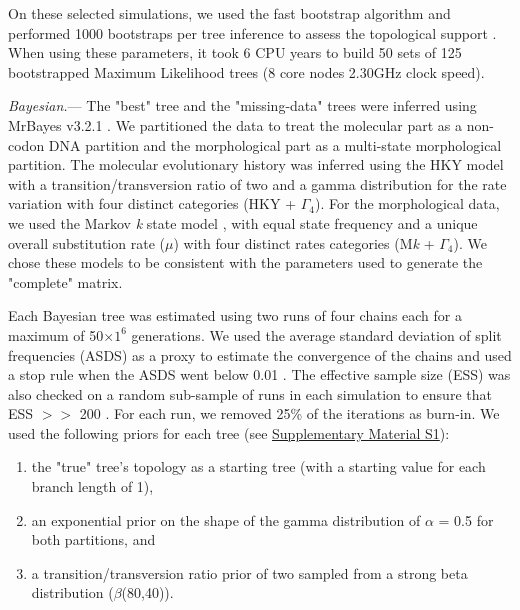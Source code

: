 \documentclass[12pt,letterpaper]{article}
\renewcommand{\subsubsection}[1]{%
\vspace{2ex}
\noindent
\textit{#1.}---}
\begin{document}
On these selected simulations, we used the fast bootstrap algorithm and performed 1000 bootstraps per tree inference to assess the topological support \citep{pattengale2010many}.
When using these parameters, it took 6 CPU years to build 50 sets of 125 bootstrapped Maximum Likelihood trees (8 core nodes 2.30GHz clock speed).

\subsubsection{Bayesian}
The "best" tree and the "missing-data" trees were inferred using MrBayes v3.2.1 \citep{Ronquist2012mrbayes}. We partitioned the data to treat the molecular part as a non-codon DNA partition and the morphological part as a multi-state morphological partition. The molecular evolutionary history was inferred using the HKY model with a transition/transversion ratio of two \citep{douadycomparison2003} and a gamma distribution for the rate variation with four distinct categories (HKY + $\Gamma_4$). For the morphological data, we used the Markov \textit{k} state model \citep{lewisa2001}, with equal state frequency and a unique overall substitution rate ($\mu$) with four distinct rates categories (M\textit{k} + $\Gamma_4$). We chose these models to be consistent with the parameters used to generate the "complete" matrix.

Each Bayesian tree was estimated using two runs of four chains each for a maximum of 50$\times$$1^6$ generations. We used the average standard deviation of split frequencies (ASDS) as a proxy to estimate the convergence of the chains and used a stop rule when the ASDS went below 0.01 \citep{Ronquist2012mrbayes}. The effective sample size (ESS) was also checked on a random sub-sample of runs in each simulation to ensure that ESS $>>$ 200 \citep{drummond2006ess}. For each run, we removed 25\% of the iterations as burn-in. We used the following priors for each tree (see \hyperref[SupplementaryMaterial]{Supplementary Material S1}):
\begin{enumerate}
\item the "true" tree’s topology as a starting tree (with a starting value for each branch length of 1),
\item an exponential prior on the shape of the gamma distribution of $\alpha$ = 0.5 for both partitions, and
\item a transition/transversion ratio prior of two sampled from a strong beta distribution ($\beta$(80,40)).
\end{enumerate}
\end{document}
